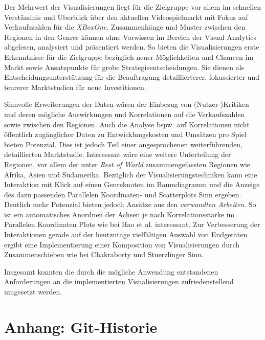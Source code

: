 \documentclass[usegeometry=true]{scrartcl}
\begin{document}
Der Mehrwert der Visualisierungen liegt für die Zielgruppe vor allem im schnellen Verständnis und Überblick über den aktuellen Videospielmarkt mit Fokus auf Verkaufszahlen für die \textit{XBoxOne}.
Zusammenhänge und Muster zwischen den Regionen in den Genres können ohne Vorwissen im Bereich der Visual Analytics abgelesen, analysiert und präsentiert werden.
So bieten die Visualisierungen erste Erkenntnisse für die Zielgruppe bezüglich neuer Möglichkeiten und Chancen im Markt sowie Ansatzpunkte für grobe Strategieentscheidungen. 
Sie dienen als Entscheidungsunterstützung für die Beauftragung detaillierterer, fokussierter und teurerer Marktstudien für neue Investitionen.

Sinnvolle Erweiterungen der Daten wären der Einbezug von (Nutzer-)Kritiken und deren mögliche Auswirkungen und Korrelationen auf die Verkaufszahlen sowie zwischen den Regionen. 
Auch die Analyse bspw. auf Korrelationen nicht öffentlich zugänglicher Daten zu Entwicklungskosten und Umsätzen pro Spiel bieten Potenzial.
Dies ist jedoch Teil einer angesprochenen weiterführenden, detaillierten Marktstudie.
Interessant wäre eine weitere Unterteilung der Regionen, vor allem der unter \textit{Rest of World} zusammengefassten Regionen wie Afrika, Asien und Südamerika.
Bezüglich der Visualisierungstechniken kann eine Interaktion mit Klick auf einen Genreknoten im Baumdiagramm und die Anzeige des dazu passenden Parallelen Koordinaten- und Scatterplots Sinn ergeben.
Deutlich mehr Potenzial bieten jedoch Ansätze aus den \textit{verwandten Arbeiten}. 
So ist ein automatisches Anordnen der Achsen je nach Korrelationsstärke im Parallelen Koordinaten Plots wie bei Hao et al. interessant.\cite{Hao.2007}
Zur Verbesserung der Interaktionen gerade auf der heutzutage vielfältigen Auswahl von Endgeräten ergibt eine Implementierung einer Komposition von Visualisierungen durch Zusammenschieben wie bei Chakraborty und Stuerzlinger Sinn.\cite{Chakraborty.2021}

Insgesamt konnten die durch die mögliche Anwendung entstandenen Anforderungen an die implementierten Visualisierungen zufriedenstellend umgesetzt werden.

\section*{Anhang: Git-Historie}

\printbibliography
\end{document}
